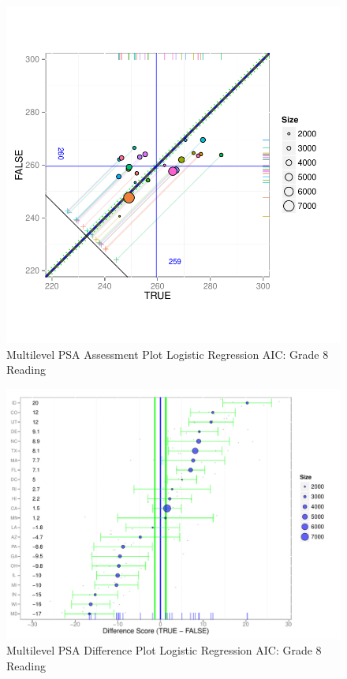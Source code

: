 \documentclass[letterpaper,12p,twoside]{article} %
\begin{document}
\begin{figure}[h!]
\begin{center}
\includegraphics[width=\textwidth]{../Figures2009/g8read-mlpsa-lrAIC-circ.pdf}
\caption{Multilevel PSA Assessment Plot Logistic Regression AIC: Grade 8 Reading}
\end{center}
\end{figure}

\begin{figure}[h!]
\begin{center}
\includegraphics[width=\textwidth]{../Figures2009/g8read-mlpsa-lrAIC-diff.pdf}
\caption{Multilevel PSA Difference Plot Logistic Regression AIC: Grade 8 Reading}
\end{center}
\end{figure}
\end{document}
